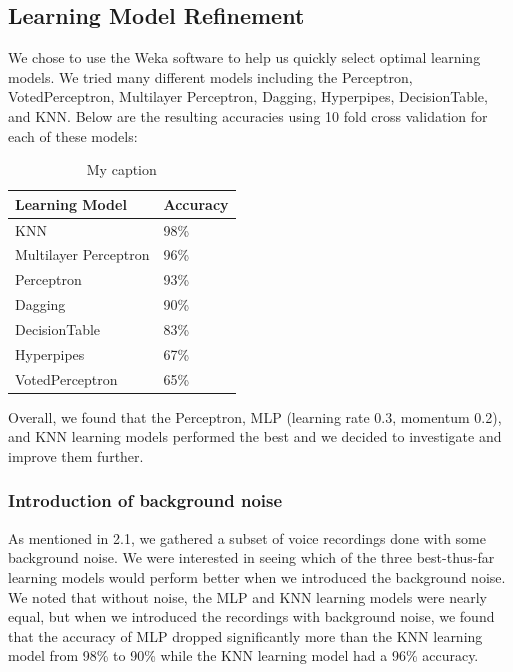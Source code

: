 \documentclass{article}
\begin{document}
\subsection{Learning Model Refinement}

We chose to use the Weka software to help us quickly select optimal learning models. We tried many different models including the Perceptron, VotedPerceptron, Multilayer Perceptron, Dagging, Hyperpipes, DecisionTable, and KNN. Below are the resulting accuracies using 10 fold cross validation for each of these models:

\begin{table}[H]
\centering
\caption{My caption}
\label{my-label}
\begin{tabular}{|l|l|}
\hline
Learning Model        & Accuracy \\ \hline
KNN                   & 98\%     \\ \hline
Multilayer Perceptron & 96\%     \\ \hline
Perceptron            & 93\%     \\ \hline
Dagging               & 90\%     \\ \hline
DecisionTable         & 83\%     \\ \hline
Hyperpipes            & 67\%     \\ \hline
VotedPerceptron       & 65\%     \\ \hline
\end{tabular}
\end{table}

Overall, we found that the Perceptron, MLP (learning rate 0.3, momentum 0.2), and KNN learning models performed the best and we decided to investigate and improve them further.

\subsubsection{Introduction of background noise}

As mentioned in 2.1, we gathered a subset of voice recordings done with some background noise. We were interested in seeing which of the three best-thus-far learning models would perform better when we introduced the background noise. We noted that without noise, the MLP and KNN learning models were nearly equal, but when we introduced the recordings with background noise, we found that the accuracy of MLP dropped significantly more than the KNN learning model from 98\% to 90\% while the KNN learning model had a 96\% accuracy.
\end{document}
